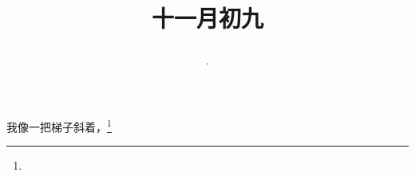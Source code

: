 \title{\date[d=9,m=12,y=2024][year:cn-y,年,month:cn,day:cn,日,·,weekday]·十一月初九 }
我像一把梯子斜着，\footnote{ }


